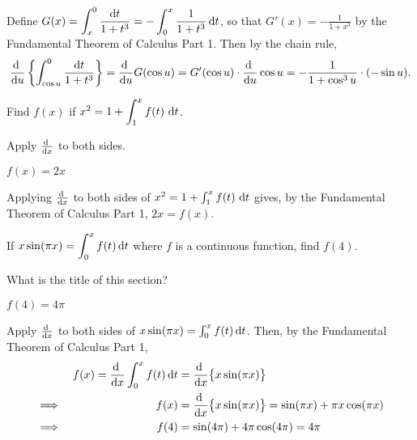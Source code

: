 \begin{solution}
Define $\displaystyle G(x) = \int_x^0 \frac{\mathrm{d}t}{1+t^3}
   = - \int_0^x \frac1{1+t^3}\,\mathrm{d}t$, so that
$\displaystyle G'(x) = - \frac1{1+x^3}$ by the Fundamental Theorem of Calculus Part 1.
Then by the chain rule,
\begin{align*}
\diff{}{u} \left\{ \int_{\cos u}^0 \frac{\dee{t}}{1+t^3} \right\}
= \diff{}{u} G(\cos u)
=  G'(\cos u) \cdot \diff{}{u}\cos u
= {-}\frac{1}{1+\cos^3 u} \cdot (-\sin{u}).
\end{align*}
\end{solution}



\begin{question}[M121 2000A]
Find  $f(x)$ if $x^2=1+\displaystyle\int_1^x f(t)\ \dee{t}$.
\end{question}

\begin{hint}
Apply $\diff{}{x}$ to both sides.
\end{hint}

\begin{answer}
$f(x)=2x$
\end{answer}

\begin{solution}
Applying $\diff{}{x}$ to both sides of
$x^2=1+\int_1^x f(t)\ \mathrm{d}t$ gives, by the Fundamental Theorem of Calculus Part 1,
$2x=f(x)$.
\end{solution}



\begin{question}[2013A]
If $x \sin(\pi x) = \displaystyle\int_0^x f(t)\, \mathrm{d}t$ where $f$
is a continuous function, find $f(4)$.
\end{question}

\begin{hint}
What is the title of this section?
\end{hint}

\begin{answer}
$f(4)=4\pi$

\end{answer}

\begin{solution}
Apply $\diff{}{x}$ to both sides of
$x \sin(\pi x) = \int_0^x f(t)\, \mathrm{d}t$. Then, by the Fundamental Theorem
of Calculus Part 1,
\begin{alignat*}{3}
&&f(x)
    =\diff{}{x} \int_0^x f(t)\, \dee{t}&=\diff{}{x}\big\{x \sin(\pi x)\big\} \\
\implies&& f(x) &= \diff{}{x}\big\{x \sin(\pi x)\big\}
               =\sin(\pi x)+\pi x\cos(\pi x) \\
\implies&& f(4)&= \sin(4\pi)+4\pi\cos(4\pi)=4\pi
\end{alignat*}

\end{solution}

